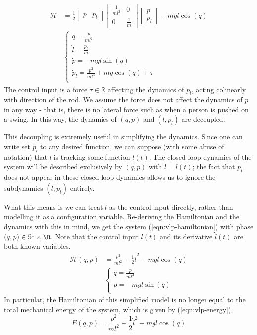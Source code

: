 \begin{align}\label{eqn:vlp-hamiltonian-with-pl}
   \mathcal{H} &= \frac{1}{2} \begin{bmatrix} p & p_l \end{bmatrix}
      \begin{bmatrix}
         \frac{1}{ml^2}  & 0 \\
         0 & \frac{1}{m}
      \end{bmatrix} \begin{bmatrix} p \\ p_l \end{bmatrix} - mgl\cos(q) \\
     &\begin{cases}
        \dot{q} = \frac{p}{ml^2} \\
        \dot{l} = \frac{p_l}{m} \\
        \dot{p} = -mgl\sin(q) \\
        \dot{p}_l = \frac{p^2}{ml^3} + mg\cos(q) + \tau \\
   \end{cases} \nonumber
\end{align}
The control input is a force \(\tau \in \mathbb{R}\) affecting the dynamics of
\(p_l\), acting colinearly with direction of the rod.
We assume the force does not affect the dynamics of \(p\) in any way -
that is, there is no lateral force such as when a person is pushed on a swing.
In this way, the dynamics of \((q,p)\) and \((l,p_l)\) are decoupled. 

This decoupling is extremely useful in simplifying the dynamics. Since one can
write set \(\dot{p}_l\) to any desired function, we can suppose (with some abuse
of notation) that \(l\) is tracking some function \(l(t)\). 
The closed loop dynamics of the system will be described exclusively by
\((\dot{q},\dot{p})\) with \(l = l(t)\); 
the fact that \(p_l\) does not appear in these closed-loop dynamics allows us to
ignore the subdynamics \((\dot{l},\dot{p}_l)\) entirely.

What this means is we can treat \(l\) as the control input directly, rather than
modelling it as a configuration variable. Re-deriving the Hamiltonian and the
dynamics with this in mind, we get the system 
(\ref{eqn:vlp-hamiltonian}) with phase \((q,p) \in \mathbb{S}^1 \times \R\). 
Note that the control input \(l(t)\) and its derivative \(\dot{l}(t)\) are both
known variables.
\begin{align}\label{eqn:vlp-hamiltonian}
   \mathcal{H}(q,p) &= \frac{p^2}{ml^2} - \frac{1}{2}\dot{l}^2 - mgl\cos(q) \\
     &\begin{cases}
        \dot{q} = \frac{p}{ml^2} \\
        \dot{p} = -mgl\sin(q) \\
      \end{cases}\nonumber
\end{align}
In particular, the Hamiltonian of this simplified model is no longer equal to
the total mechanical energy of the system, which is given by
(\ref{eqn:vlp-energy}).
\begin{equation}\label{eqn:vlp-energy}
   E(q,p) = \frac{p^2}{ml^2} + \frac{1}{2}\dot{l}^2 - mgl\cos(q)
\end{equation}
